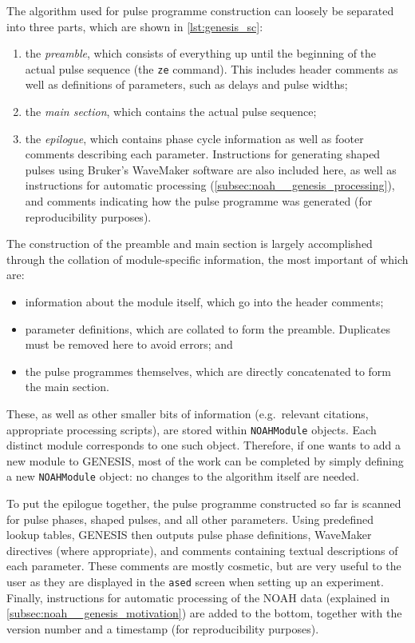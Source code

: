 The algorithm used for pulse programme construction can loosely be separated into three parts, which are shown in \cref{lst:genesis_sc}:
\begin{enumerate}
    \item the \textit{preamble}, which consists of everything up until the beginning of the actual pulse sequence (the \texttt{ze} command). This includes header comments as well as definitions of parameters, such as delays and pulse widths;
    \item the \textit{main section}, which contains the actual pulse sequence;
    \item the \textit{epilogue}, which contains phase cycle information as well as footer comments describing each parameter. Instructions for generating shaped pulses using Bruker's WaveMaker software are also included here, as well as instructions for automatic processing (\cref{subsec:noah__genesis_processing}), and comments indicating how the pulse programme was generated (for reproducibility purposes).
\end{enumerate}

The construction of the preamble and main section is largely accomplished through the collation of module-specific information, the most important of which are:
\begin{itemize}
    \item information about the module itself, which go into the header comments;
    \item parameter definitions, which are collated to form the preamble. Duplicates must be removed here to avoid errors; and
    \item the pulse programmes themselves, which are directly concatenated to form the main section.
\end{itemize}
These, as well as other smaller bits of information (e.g.\ relevant citations, appropriate processing scripts), are stored within \texttt{NOAHModule} objects.
Each distinct module corresponds to one such object.
Therefore, if one wants to add a new module to GENESIS, most of the work can be completed by simply defining a new \texttt{NOAHModule} object: no changes to the algorithm itself are needed.

To put the epilogue together, the pulse programme constructed so far is scanned for pulse phases, shaped pulses, and all other parameters.
Using predefined lookup tables, GENESIS then outputs pulse phase definitions, WaveMaker directives (where appropriate), and comments containing textual descriptions of each parameter.
These comments are mostly cosmetic, but are very useful to the user as they are displayed in the \texttt{ased} screen when setting up an experiment.
Finally, instructions for automatic processing of the NOAH data (explained in \cref{subsec:noah__genesis_motivation}) are added to the bottom, together with the version number and a timestamp (for reproducibility purposes).

